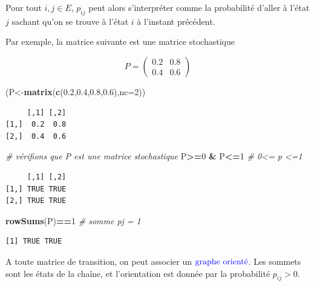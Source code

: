 \documentclass[
]{book}
\newenvironment{Shaded}{\begin{snugshade}}{\end{snugshade}}
\newcommand{\CommentTok}[1]{\textcolor[rgb]{0.56,0.35,0.01}{\textit{#1}}}
\newcommand{\DataTypeTok}[1]{\textcolor[rgb]{0.13,0.29,0.53}{#1}}
\newcommand{\DecValTok}[1]{\textcolor[rgb]{0.00,0.00,0.81}{#1}}
\newcommand{\FloatTok}[1]{\textcolor[rgb]{0.00,0.00,0.81}{#1}}
\newcommand{\KeywordTok}[1]{\textcolor[rgb]{0.13,0.29,0.53}{\textbf{#1}}}
\newcommand{\NormalTok}[1]{#1}
\newcommand{\OperatorTok}[1]{\textcolor[rgb]{0.81,0.36,0.00}{\textbf{#1}}}
\newcommand{\StringTok}[1]{\textcolor[rgb]{0.31,0.60,0.02}{#1}}
\theoremstyle{definition}
\theoremstyle{definition}
\theoremstyle{definition}
\theoremstyle{remark}
\begin{document}
Pour tout \(i,j \in E\), \(p_{ij}\) peut alors s'interpréter comme la probabilité d'aller à l'état \(j\) sachant qu'on se trouve à l'état \(i\) à l'instant précédent.

Par exemple, la matrice suivante est une matrice stochastique

\[
P=\left( 
\begin{array}{cc}
0.2 & 0.8\\
0.4 & 0.6
\end{array}
\right)
\]

\begin{Shaded}
\begin{Highlighting}[]
\NormalTok{(P<-}\KeywordTok{matrix}\NormalTok{(}\KeywordTok{c}\NormalTok{(}\FloatTok{0.2}\NormalTok{,}\FloatTok{0.4}\NormalTok{,}\FloatTok{0.8}\NormalTok{,}\FloatTok{0.6}\NormalTok{),}\DataTypeTok{nc=}\DecValTok{2}\NormalTok{))}
\end{Highlighting}
\end{Shaded}

\begin{verbatim}
     [,1] [,2]
[1,]  0.2  0.8
[2,]  0.4  0.6
\end{verbatim}

\begin{Shaded}
\begin{Highlighting}[]
\CommentTok{# vérifions que P est une matrice stochastique}
\NormalTok{P}\OperatorTok{>=}\DecValTok{0} \OperatorTok{&}\StringTok{ }\NormalTok{P}\OperatorTok{<=}\DecValTok{1}  \CommentTok{# 0<= p <=1}
\end{Highlighting}
\end{Shaded}

\begin{verbatim}
     [,1] [,2]
[1,] TRUE TRUE
[2,] TRUE TRUE
\end{verbatim}

\begin{Shaded}
\begin{Highlighting}[]
\KeywordTok{rowSums}\NormalTok{(P)}\OperatorTok{==}\DecValTok{1} \CommentTok{# somme pj = 1}
\end{Highlighting}
\end{Shaded}

\begin{verbatim}
[1] TRUE TRUE
\end{verbatim}

A toute matrice de transition, on peut associer un \(\color{blue}{\mathbf{\text{graphe orienté}}}\). Les sommets sont les états de la chaîne, et l'orientation est donnée par la probabilité \(p_{ij}>0\).
\end{document}
